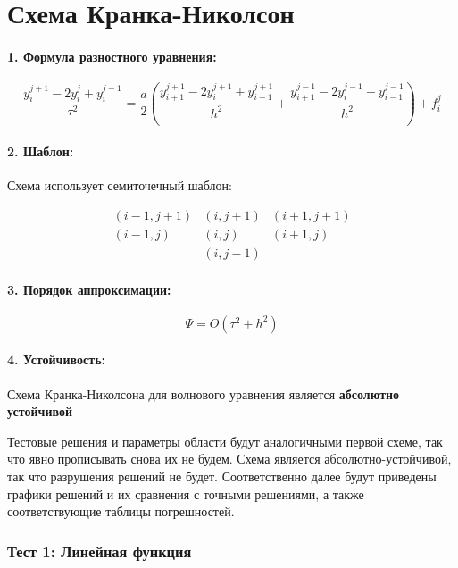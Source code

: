 \documentclass[12pt,a4paper]{article}
\begin{document}
\section{Схема Кранка-Николсон}


\paragraph{1. Формула разностного уравнения:}

\[
\frac{y_i^{j+1} - 2y_i^j + y_i^{j-1}}{\tau^2} = \frac{a}{2} \left( \frac{y_{i+1}^{j+1} - 2y_i^{j+1} + y_{i-1}^{j+1}}{h^2} + \frac{y_{i+1}^{j-1} - 2y_i^{j-1} + y_{i-1}^{j-1}}{h^2} \right) + f_i^j
\]


\paragraph{2. Шаблон:}

Схема использует семиточечный шаблон:

\[
\begin{array}{ccc}
(i-1, j+1) & (i, j+1) & (i+1, j+1) \\
(i-1, j) & (i, j) & (i+1, j) \\
& (i, j-1) &
\end{array}
\]

\paragraph{3. Порядок аппроксимации:}

\[
\Psi = O(\tau^2 + h^2)
\]


\paragraph{4. Устойчивость:}

Схема Кранка-Николсона для волнового уравнения является \textbf{абсолютно устойчивой}


\medskip

\medskip

Тестовые решения и параметры области будут аналогичными первой схеме, так что явно прописывать снова их не будем. Схема является абсолютно-устойчивой, так что разрушения
решений не будет. Соответственно далее будут приведены графики решений и их сравнения с точными решениями, а также соответствующие таблицы погрешностей.

\medskip

\subsubsection{Тест 1: Линейная функция}
\end{document}
